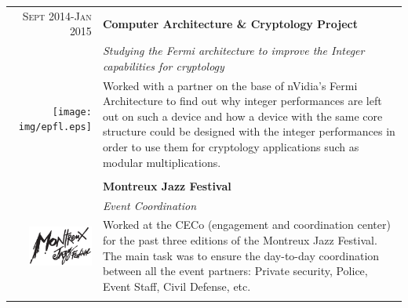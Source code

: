 \documentclass[a4paper,11pt]{article} %
\begin{document}
\begin{tabularx}{\textwidth}{r|X}

\textsc{Sept 2014-Jan 2015} & \textbf{Computer Architecture \& Cryptology Project}\\
\multirow{4}{*}{ \texttt{[image: img/epfl.eps]}}
& \emph{Studying the Fermi architecture to improve the Integer capabilities for cryptology}\\
& \footnotesize{Worked with a partner on the base of nVidia's Fermi Architecture to find out why integer performances
are left out on such a device and how a device with the same core structure could be designed
with the integer performances in order to use them for cryptology applications such as modular multiplications.}\\
\multicolumn{2}{c}{} \\


\textsc{July 2013, 2014 \& 2015} & \textbf{Montreux Jazz Festival} \\
\multirow{4}{*}{ \includegraphics[width=60pt]{img/mjf.eps}}
& \emph{Event Coordination}\\ 
& \footnotesize{Worked at the CECo (engagement and coordination center) for the past three editions of the Montreux Jazz Festival.
The main task was to ensure the day-to-day coordination between all the event partners: Private security, Police, Event Staff, Civil Defense, etc. }\\
\multicolumn{2}{c}{} \\


\end{tabularx}

\end{document}
